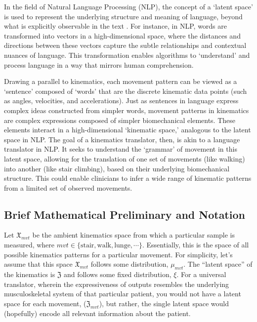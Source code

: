 In the field of Natural Language Processing (NLP), the concept of a `latent space' is used to represent the underlying structure and meaning of language, beyond what is explicitly observable in the text \cite{jurafskySpeechLanguageProcessing2009}.
For instance, in NLP, words are transformed into vectors in a high-dimensional space, where the distances and directions between these vectors capture the subtle relationships and contextual nuances of language.
This transformation enables algorithms to `understand' and process language in a way that mirrors human comprehension.

Drawing a parallel to kinematics, each movement pattern can be viewed as a `sentence' composed of `words' that are the discrete kinematic data points (such as angles, velocities, and accelerations).
Just as sentences in language express complex ideas constructed from simpler words, movement patterns in kinematics are complex expressions composed of simpler biomechanical elements.
These elements interact in a high-dimensional `kinematic space,' analogous to the latent space in NLP.
The goal of a kinematics translator, then, is akin to a language translator in NLP.
It seeks to understand the `grammar' of movement in this latent space, allowing for the translation of one set of movements (like walking) into another (like stair climbing), based on their underlying biomechanical structure.
This could enable clinicians to infer a wide range of kinematic patterns from a limited set of observed movements.


\subsection{Brief Mathematical Preliminary and Notation}
Let $\mathfrak{X}_{mvt}$ be the ambient kinematics space from which a particular sample is measured, where $mvt \in \{\text{stair},\text{walk}, \text{lunge}, \cdots\}$.
Essentially, this is the space of all possible kinematics patterns for a particular movement.
For simplicity, let's assume that this space $\mathfrak{X}_{mvt}$ follows some distribution, $\mu_{mvt}$.
The ``latent space'' of the kinematics is $\mathfrak{Z}$ and follows some fixed distribution, $\xi$.
For a universal translator, wherein the expressiveness of outputs resembles the underlying musculoskeletal system of that particular patient, you would not have a latent space for each movement, ($\mathfrak{Z}_{mvt}$), but rather, the single latent space would (hopefully) encode all relevant information about the patient.


